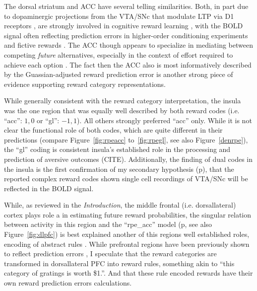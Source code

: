 \documentclass[doc,12pt]{apa}        %
\begin{document}
The dorsal striatum and ACC have several telling similarities.  Both, in part due to dopaminergic projections from the VTA/SNc that modulate LTP via D1 receptors \cite{Schweimer:2006p9780}, are strongly involved in cognitive reward learning \cite{Atlas:2010p7566,Hayden:2009p6545,Rudebeck:2008p4712,Rolls:2008p7577,Quilodran:2008p2645,Hampton:2007p2983,Ernst:2004p3998}, with the BOLD signal often reflecting prediction errors in higher-order conditioning experiments \cite{seymour:2004aa} and fictive rewards \cite{Hayden:2009p6545}.  The ACC though appears to specialize in mediating between competing \emph{future} alternatives, especially in the context of effort required to achieve each option \cite{Quilodran:2008p2645}.  The fact then the ACC also is most informatively described by the Guassian-adjusted reward prediction error is another strong piece of evidence supporting reward category representations.  

While generally consistent with the reward category interpretation, the insula was the one region that was equally well described by both reward codes (i.e. ``acc'': ${1,0}$ or ``gl'': ${-1,1}$).  All others strongly preferred ``acc'' only.  While it is not clear the functional role of both codes, which are quite different in their predictions (compare Figure~\ref{fig:rpeacc} to~\ref{fig:rpegl}, see also Figure~\ref{denrpe}), the ``gl'' coding is consistent insula's established role in the processing and prediction of aversive outcomes (CITE).  Additionally, the finding of dual codes in the insula is the first confirmation of my secondary hypothesis (p\pageref{subsub:codesandfits}), that the reported complex reward codes shown single cell recordings of VTA/SNc \cite{Kim:2006p1063,Matsumoto:2009p7219,Smith:2011p8133} will be reflected in the BOLD signal.

While, as reviewed in the \emph{Introduction}, the middle frontal (i.e. dorsallateral) cortex plays role a in estimating future reward probabilities, the singular relation between activity in this region and the ``rpe\_acc'' model (p\pageref{subsub:onsheet}, see also Figure~\ref{fig:dlpfc}) is best explained another of this regions well established roles, encoding of abstract rules \cite{Wallis:2001p8129}.  While prefrontal regions have been previously shown to reflect prediction errors \cite{Ramnani:2004p5390}, I speculate that the reward categories are transformed in dorsallateral PFC into reward rules, something akin to ``this category of gratings is worth \$1.''.  And that these rule encoded rewards have their own reward prediction errors calculations.
\end{document}
